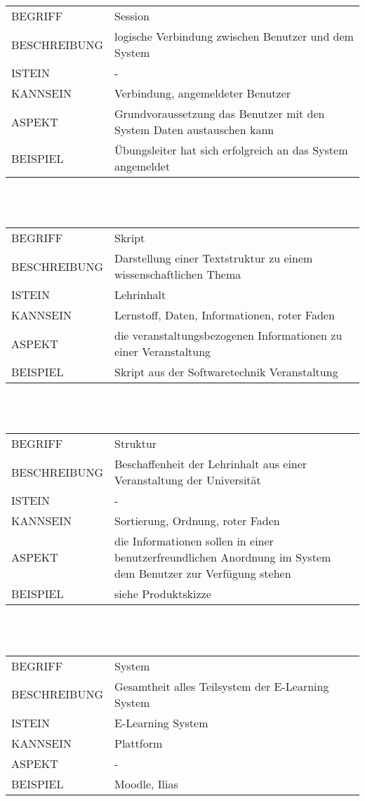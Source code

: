 \documentclass[12pt,a4paper]{article}
\begin{document}
\begin{tabular}{l p{10cm}}
BEGRIFF 	 & Session \\ 
BESCHREIBUNG & logische Verbindung zwischen Benutzer und dem System\\ 
ISTEIN   	 & -\\
KANNSEIN 	 & Verbindung, angemeldeter Benutzer\\ 
ASPEKT   	 & Grundvoraussetzung das Benutzer mit den System Daten austauschen kann\\
BEISPIEL 	 & Übungsleiter hat sich erfolgreich an das System angemeldet\\
\hline
\end{tabular}\\\\  

\begin{tabular}{l p{10cm}}
BEGRIFF 	 & Skript \\ 
BESCHREIBUNG & Darstellung einer Textstruktur zu einem wissenschaftlichen Thema\\ 
ISTEIN   	 & Lehrinhalt\\
KANNSEIN 	 & Lernstoff, Daten, Informationen, roter Faden\\ 
ASPEKT   	 & die veranstaltungsbezogenen Informationen zu einer 							   Veranstaltung\\
BEISPIEL 	 & Skript aus der Softwaretechnik Veranstaltung\\
\hline
\end{tabular}\\\\  

\begin{tabular}{l p{10cm}}
BEGRIFF 	 & Struktur \\ 
BESCHREIBUNG & Beschaffenheit der Lehrinhalt aus einer Veranstaltung der 					   Universität\\ 
ISTEIN   	 & - \\
KANNSEIN 	 & Sortierung, Ordnung, roter Faden\\ 
ASPEKT   	 & die Informationen sollen in einer benutzerfreundlichen Anordnung im System dem Benutzer zur Verfügung stehen\\
BEISPIEL 	 & siehe Produktskizze\\
\hline
\end{tabular}\\\\ 

\begin{tabular}{l p{10cm}} 
BEGRIFF 	 & System \\ 
BESCHREIBUNG & Gesamtheit alles Teilsystem der E-Learning System \\ 
ISTEIN   	 & E-Learning System\\
KANNSEIN 	 & Plattform\\ 
ASPEKT   	 & -\\
BEISPIEL 	 & Moodle, Ilias\\
\hline
\end{tabular}\\\\  
\end{document}
